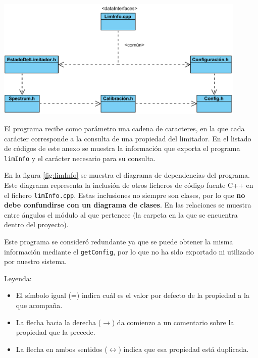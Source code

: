 
\begin{center}
    \includegraphics[width=0.9\textwidth]{figuras/lms9-limInfo.pdf}
    \label{fig:limInfo}
\end{center}

El programa recibe como parámetro una cadena de caracteres, en la que cada carácter corresponde a la consulta de una propiedad del limitador. En el listado de códigos de este anexo se muestra la información que exporta el programa \verb|limInfo| y el carácter necesario para su consulta.

En la figura \ref{fig:limInfo} se muestra el diagrama de dependencias del programa. Este diagrama representa la inclusión de otros ficheros de código fuente C++ en el fichero \verb|limInfo.cpp|. Estas inclusiones no siempre son clases, por lo que \textbf{no debe confundirse con un diagrama de clases}. En las relaciones se muestra entre ángulos el módulo al que pertenece (la carpeta en la que se encuentra dentro del proyecto).

Este programa se consideró redundante ya que se puede obtener la misma información mediante el \verb|getConfig|, por lo que no ha sido exportado ni utilizado por nuestro sistema.

Leyenda:
\begin{itemize}
    \item El símbolo igual (=) indica cuál es el valor por defecto de la propiedad a la que acompaña.
    \item La flecha hacia la derecha ($\rightarrow$) da comienzo a un comentario sobre la propiedad que la precede.
    \item La flecha en ambos sentidos ($\leftrightarrow$) indica que esa propiedad está duplicada.
\end{itemize}

